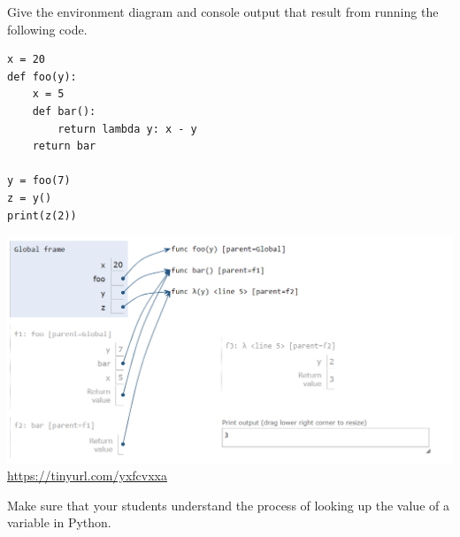 \begin{blocksection}
\question Give the environment diagram and console output that result from running the following code.

\begin{lstlisting}
x = 20
def foo(y):
    x = 5
    def bar():
        return lambda y: x - y
    return bar

y = foo(7)
z = y()
print(z(2))
\end{lstlisting}

\begin{solution}[2in]
\includegraphics[scale=0.5]{foobar.png}
\\
\url{https://tinyurl.com/yxfcvxxa}
\end{solution}
\end{blocksection}

\begin{questionmeta}
  Make sure that your students understand the process of looking up the value of a variable in Python. 
\end{questionmeta}
    